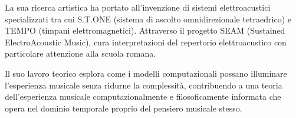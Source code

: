 \documentclass[12pt,a4paper]{article}
\begin{document}
La sua ricerca artistica ha portato all'invenzione di sistemi elettroacustici specializzati tra cui S.T.ONE (sistema di ascolto omnidirezionale tetraedrico) e TEMPO (timpani elettromagnetici). Attraverso il progetto SEAM (Sustained ElectroAcoustic Music), cura interpretazioni del repertorio elettroacustico con particolare attenzione alla scuola romana.

Il suo lavoro teorico esplora come i modelli computazionali possano illuminare l'esperienza musicale senza ridurne la complessità, contribuendo a una teoria dell'esperienza musicale computazionalmente e filosoficamente informata che opera nel dominio temporale proprio del pensiero musicale stesso.
\end{document}
